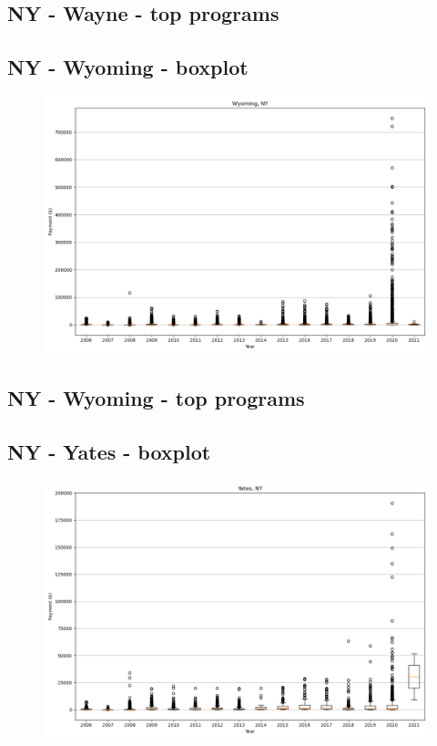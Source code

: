 \subsection*{NY - Wayne - top programs}

\newpage
\subsection*{NY - Wyoming - boxplot}
\begin{figure}[h]
\centering
\includegraphics[width=7in]{../output/boxplots/counties/Wyoming-NY_boxplot.png}
\end{figure}


\subsection*{NY - Wyoming - top programs}

\newpage
\subsection*{NY - Yates - boxplot}
\begin{figure}[h]
\centering
\includegraphics[width=7in]{../output/boxplots/counties/Yates-NY_boxplot.png}
\end{figure}


